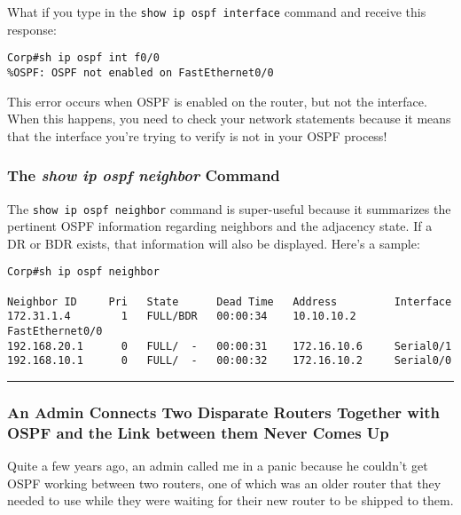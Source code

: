 What if you type in the \texttt{show\ ip\ ospf\ interface} command and
receive this response:

\begin{verbatim}
Corp#sh ip ospf int f0/0
%OSPF: OSPF not enabled on FastEthernet0/0
\end{verbatim}

This error occurs when OSPF is enabled on the router, but not the
interface. When this happens, you need to check your network statements
because it means that the interface you're trying to verify is not in
your OSPF process!

\subsubsection[The \emph{show ip ospf neighbor}
Command]{\texorpdfstring{\protect\hypertarget{c18.xhtmlux5cux23c18-sec-15}{}{}The
\emph{show ip ospf neighbor}
Command}{The show ip ospf neighbor Command}}

The \texttt{show\ ip\ ospf\ neighbor} command is super-useful because it
summarizes the pertinent OSPF information regarding neighbors and the
adjacency state. If a DR or BDR exists, that information will also be
displayed. Here's a sample:

\begin{verbatim}
Corp#sh ip ospf neighbor
 
Neighbor ID     Pri   State      Dead Time   Address         Interface
172.31.1.4        1   FULL/BDR   00:00:34    10.10.10.2     FastEthernet0/0
192.168.20.1      0   FULL/  -   00:00:31    172.16.10.6     Serial0/1
192.168.10.1      0   FULL/  -   00:00:32    172.16.10.2     Serial0/0
\end{verbatim}

\begin{center}\rule{0.5\linewidth}{0.5pt}\end{center}

\subsubsection[\hfill\break
An Admin Connects Two Disparate Routers Together with OSPF and the Link
between them Never Comes
Up]{\texorpdfstring{%
An Admin Connects Two Disparate Routers Together with OSPF and the Link
between them Never Comes
Up}{ An Admin Connects Two Disparate Routers Together with OSPF and the Link between them Never Comes Up}}

Quite a few years ago, an admin called me in a panic because he couldn't
get OSPF working between two routers, one of which was an older router
that they needed to use while they were waiting for their new router to
be shipped to them.

